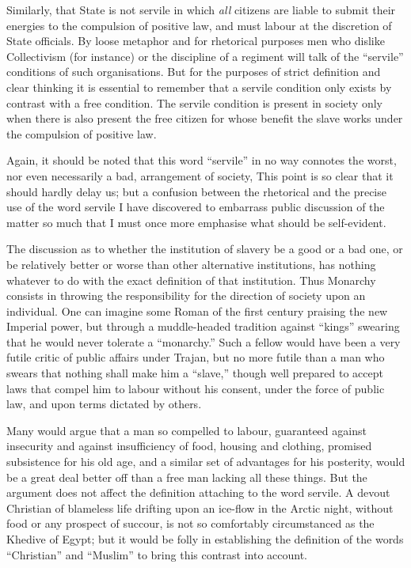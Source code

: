 \documentclass{book}
\begin{document}
Similarly, that State is not servile in which \emph{all} citizens are liable to submit their energies to the compulsion of positive law, and must labour at the discretion of State officials. By loose metaphor and for rhetorical purposes men who dislike Collectivism (for instance) or the discipline of a regiment will talk of the “servile” conditions of such organisations. But for the purposes of strict definition and clear thinking it is essential to remember that a servile condition only exists by contrast with a free condition. The servile condition is present in society only when there is also present the free citizen for whose benefit the slave works under the compulsion of positive law.

Again, it should be noted that this word “servile” in no way connotes the worst, nor even necessarily a bad, arrangement of society, This point is so clear that it should hardly delay us; but a confusion between the rhetorical and the precise use of the word servile I have discovered to embarrass public discussion of the matter so much that I must once more emphasise what should be self-evident.

The discussion as to whether the institution of slavery be a good or a bad one, or be relatively better or worse than other alternative institutions, has nothing whatever to do with the exact definition of that institution. Thus Monarchy consists in throwing the responsibility for the direction of society upon an individual. One can imagine some Roman of the first century praising the new Imperial power, but through a muddle-headed tradition against “kings” swearing that he would never tolerate a “monarchy.” Such a fellow would have been a very futile critic of public affairs under Trajan, but no more futile than a man who swears that nothing shall make him a “slave,” though well prepared to accept laws that compel him to labour without his consent, under the force of public law, and upon terms dictated by others.

Many would argue that a man so compelled to labour, guaranteed against insecurity and against insufficiency of food, housing and clothing, promised subsistence for his old age, and a similar set of advantages for his posterity, would be a great deal better off than a free man lacking all these things. But the argument does not affect the definition attaching to the word servile. A devout Christian of blameless life drifting upon an ice-flow in the Arctic night, without food or any prospect of succour, is not so comfortably circumstanced as the Khedive of Egypt; but it would be folly in establishing the definition of the words “Christian” and “Muslim” to bring this contrast into account.
\end{document}

